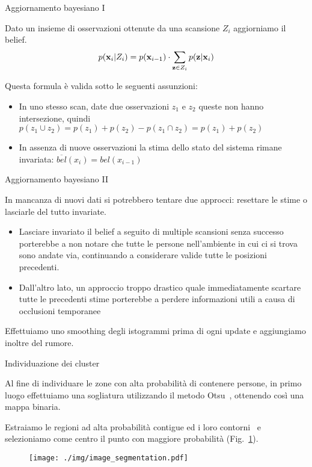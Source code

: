 \documentclass[10pt]{beamer}
\begin{document}
	\begin{frame}{Aggiornamento bayesiano I}
	
	Dato un insieme di osservazioni ottenute da una scansione $ Z_i $ aggiorniamo il belief.
	\begin{equation}\label{eq:belief-update}
		p({\bf x}_i | Z_i) = p({\bf x}_{i-1}) \cdot 
		\sum_{{\bf z} \in Z_i} p({\bf z} | {\bf x}_i)
	\end{equation}

	Questa formula è valida sotto le seguenti assunzioni:
	\begin{itemize}
		\pause\item In uno stesso scan, date due osservazioni $z_1$ e
			$z_2$ queste non hanno intersezione, quindi $ p(z_1 \cup z_2) =
			p(z_1)+p(z_2)-p( z_1 \cap z_2) = p(z_1)+p(z_2) $ 

		\pause\item In assenza di nuove osservazioni la stima dello stato del sistema
			rimane invariata: $ \overline{bel}(x_i) = bel(x_{i-1}) $ 

	\end{itemize}
	
	\end{frame}
	\begin{frame}{Aggiornamento bayesiano II}

	In mancanza di nuovi dati si potrebbero tentare due approcci:
	resettare le stime o lasciarle del tutto invariate. 
	\begin{itemize} 
		\pause\item Lasciare invariato il belief a seguito di multiple scansioni
			senza successo porterebbe a non notare che tutte le persone
			nell'ambiente in cui ci si trova sono andate via, continuando a
			considerare valide tutte le posizioni precedenti.
		\pause\item Dall'altro lato, un approccio troppo drastico quale
			immediatamente scartare tutte le precedenti stime porterebbe a
			perdere informazioni utili a causa di occlusioni temporanee
	\end{itemize}
	
	\pause Effettuiamo uno smoothing degli istogrammi
	prima di ogni update e aggiungiamo inoltre del rumore. 
	
	\end{frame}
	\begin{frame}{Individuazione dei cluster}
	
	Al fine di individuare le zone con alta probabilità di contenere persone, 
	in primo luogo effettuiamo una sogliatura utilizzando il metodo Otsu~\cite{otsu}, 
	ottenendo così una mappa binaria.
		
	Estraiamo le regioni ad alta probabilità contigue
	ed i loro contorni~\cite{contours} e selezioniamo come centro il punto
	con maggiore probabilità (Fig.~\ref{fig:image_segmentation}).

	\begin{figure}[H]
		\centering
		\texttt{[image: ./img/image\_segmentation.pdf]}
		\label{fig:image_segmentation}
	\end{figure}

	\end{frame}
	
\end{document}

